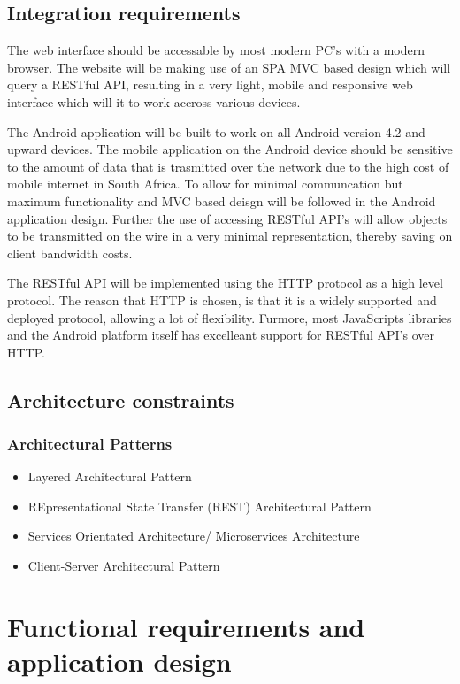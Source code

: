 \documentclass[a4paper,10pt]{article}
\begin{document}
\subsection{Integration requirements}
The web interface should be accessable by most modern PC's with a modern browser. The website will be making use of an SPA MVC based design which will query a RESTful API, resulting in a very light, mobile and responsive web interface which will it to work accross various devices.

The Android application will be built to work on all Android version 4.2 and upward devices. The mobile application on the Android device should be sensitive to the amount of data that is trasmitted over the network due to the high cost of mobile internet in South Africa. To allow for minimal communcation but maximum functionality and MVC based deisgn will be followed in the Android application design.  Further the use of accessing RESTful API's will allow objects to be transmitted on the wire in a very minimal representation, thereby saving on client bandwidth costs.

The RESTful API will be implemented using the HTTP protocol as a high level protocol. The reason that HTTP is chosen, is that it is a widely supported and deployed protocol, allowing a lot of flexibility. Furmore, most JavaScripts libraries and the Android platform itself has excelleant support for RESTful API's over HTTP.

\subsection{Architecture constraints}
\subsubsection{Architectural Patterns}
	\begin{itemize}
		\item Layered Architectural Pattern
		\item REpresentational State Transfer (REST) Architectural Pattern
		\item Services Orientated Architecture/ Microservices Architecture
		\item Client-Server Architectural Pattern
	\end{itemize}

\section{Functional requirements and application design}
\end{document}
